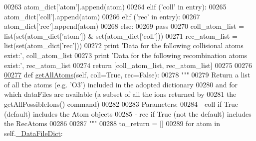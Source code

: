 \begin{DoxyCode}
00263                                 atom\_dict[\textcolor{stringliteral}{'atom'}].append(atom)
00264                             \textcolor{keywordflow}{elif} (\textcolor{stringliteral}{'coll'} \textcolor{keywordflow}{in} entry):
00265                                 atom\_dict[\textcolor{stringliteral}{'coll'}].append(atom)
00266                             \textcolor{keywordflow}{elif} (\textcolor{stringliteral}{'rec'} \textcolor{keywordflow}{in} entry):
00267                                 atom\_dict[\textcolor{stringliteral}{'rec'}].append(atom)
00268                             \textcolor{keywordflow}{else}:
00269                                 \textcolor{keywordflow}{pass}
00270         coll\_atom\_list = list(set(atom\_dict[\textcolor{stringliteral}{'atom'}]) & set(atom\_dict[\textcolor{stringliteral}{'coll'}]))
00271         rec\_atom\_list = list(set(atom\_dict[\textcolor{stringliteral}{'rec'}]))
00272         \textcolor{keywordflow}{print} \textcolor{stringliteral}{'Data for the following collisional atoms exist:'}, coll\_atom\_list
00273         \textcolor{keywordflow}{print} \textcolor{stringliteral}{'Data for the following recombination atoms exist:'}, rec\_atom\_list
00274         \textcolor{keywordflow}{return} [coll\_atom\_list, rec\_atom\_list] 
00275         
00276     
\hypertarget{manage__atomic__data_8py_source_l00277}{}\hyperlink{classpyneb_1_1utils_1_1manage__atomic__data_1_1___manage_atomic_data_a6e4f6d5890cfb5e3371b46c319c67f53}{00277}     \textcolor{keyword}{def }\hyperlink{classpyneb_1_1utils_1_1manage__atomic__data_1_1___manage_atomic_data_a6e4f6d5890cfb5e3371b46c319c67f53}{getAllAtoms}(self, coll=True, rec=False):
00278         \textcolor{stringliteral}{"""}
00279 \textcolor{stringliteral}{        Return a list of all the atoms (e.g. 'O3') included in the adopted dictionary }
00280 \textcolor{stringliteral}{        and for which dataFiles are available (a subset of all the ions returned by}
00281 \textcolor{stringliteral}{        the getAllPossibleIons() command)}
00282 \textcolor{stringliteral}{}
00283 \textcolor{stringliteral}{        Parameters:}
00284 \textcolor{stringliteral}{            - coll     if True (default) includes the Atom objects}
00285 \textcolor{stringliteral}{            - rec     if True (not the default) includes the RecAtoms}
00286 \textcolor{stringliteral}{}
00287 \textcolor{stringliteral}{        """}
00288         to\_return = []
00289         \textcolor{keywordflow}{for} atom \textcolor{keywordflow}{in} self.\hyperlink{classpyneb_1_1utils_1_1manage__atomic__data_1_1___manage_atomic_data_a25a8e0770b6d8a375cfc9092d600684d}{\_DataFileDict}:

\end{DoxyCode}
